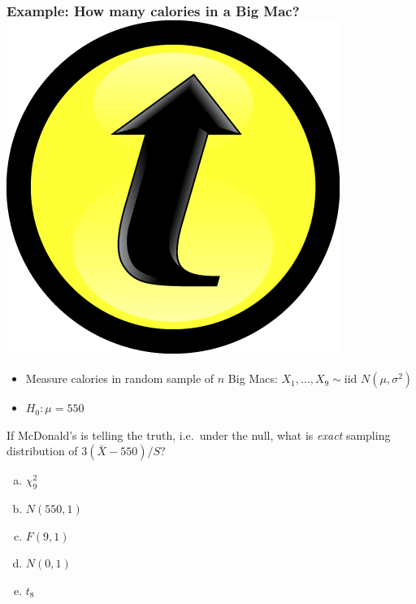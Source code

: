 \documentclass[handout]{beamer}
\begin{document}
\begin{frame}[t]
	\frametitle{Example: How many calories in a Big Mac? \hfill \includegraphics[scale = 0.05]{./images/clicker}}
\begin{itemize}
	\item Measure calories in random sample of $n$ Big Macs: $X_1, \hdots, X_9 \sim \mbox{iid } N (\mu, \sigma^2)$
	\item $H_0\colon \mu = 550$
\end{itemize}

\vspace{1em}

\alert{If McDonald's is telling the truth, i.e.\ under the null, what is \emph{exact}  sampling distribution of $3(\bar{X} - 550)/S$?}
\begin{enumerate}[(a)]
	\item $\chi^2_{9}$
	\item $N(550, 1)$
	\item $F(9, 1)$
	\item $N(0,1)$ 
	\item $t_{8}$
\end{enumerate}
\end{frame}
\end{document}
